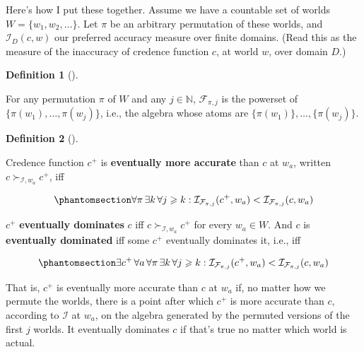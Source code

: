 \documentclass[
  11pt,
  letterpaper,
  DIV=11,
  numbers=noendperiod,
  twoside]{scrartcl}
\theoremstyle{definition}
\newtheorem{definition}{Definition}[section]
\theoremstyle{plain}
\theoremstyle{plain}
\theoremstyle{remark}
\begin{document}
Here's how I put these together. Assume we have a countable set of
worlds \(W = \{w_1, w_2, \dots\}\). Let \(\pi\) be an arbitrary
permutation of these worlds, and \(\mathcal{I}_D(c, w)\) our preferred
accuracy measure over finite domains. (Read this as the measure of the
inaccuracy of credence function \(c\), at world \(w\), over domain
\(D\).)

\begin{definition}[]\protect\hypertarget{def-stage}{}\label{def-stage}

For any permutation \(\pi\) of \(W\) and any \(j \in \mathbb{N}\),
\(\mathcal{F}_{\pi,j}\) is the powerset of
\(\{\pi(w_1), \dots, \pi(w_j)\}\), i.e., the algebra whose atoms are
\(\{\pi(w_1)\}, \dots, \{\pi(w_j)\}\).

\end{definition}

\begin{definition}[]\protect\hypertarget{def-eventual}{}\label{def-eventual}

Credence function \(c^+\) is \textbf{eventually more accurate} than
\(c\) at \(w_a\), written \(c \succ_{\mathcal{I}, w_a} c^+\), iff

\begin{equation}\protect\phantomsection\label{eq-eventual}{
\forall \pi\, \exists k\, \forall j \geqslant k: \mathcal{I}_{\mathcal{F}_{\pi,j}}(c^+, w_a) < \mathcal{I}_{\mathcal{F}_{\pi,j}}(c, w_a)
}\end{equation}

\(c^+\) \textbf{eventually dominates} \(c\) iff
\(c \succ_{\mathcal{I}, w_a} c^+\) for every \(w_a \in W\). And \(c\) is
\textbf{eventually dominated} iff some \(c^+\) eventually dominates it,
i.e., iff

\begin{equation}\protect\phantomsection\label{eq-dominated}{
\exists c^+\, \forall a\, \forall \pi\, \exists k\, \forall j \geqslant k: \mathcal{I}_{\mathcal{F}_{\pi,j}}(c^+, w_a) < \mathcal{I}_{\mathcal{F}_{\pi,j}}(c, w_a)
}\end{equation}

\end{definition}

That is, \(c^+\) is eventually more accurate than \(c\) at \(w_a\) if,
no matter how we permute the worlds, there is a point after which
\(c^+\) is more accurate than \(c\), according to \(\mathcal{I}\) at
\(w_a\), on the algebra generated by the permuted versions of the first
\(j\) worlds. It eventually dominates \(c\) if that's true no matter
which world is actual.
\end{document}

